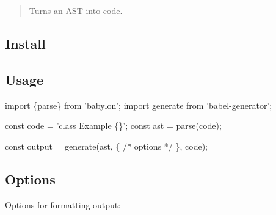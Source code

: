 \begin{quote}
Turns an A\+ST into code. \end{quote}


\subsection*{Install}




\subsection*{Usage}


\begin{DoxyCode}
import \{parse\} from 'babylon';
import generate from 'babel-generator';

const code = 'class Example \{\}';
const ast = parse(code);

const output = generate(ast, \{ /* options */ \}, code);
\end{DoxyCode}


\subsection*{Options}

Options for formatting output\+:

